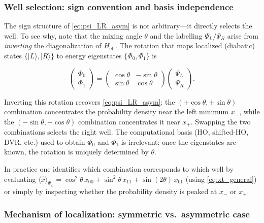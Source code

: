 \subsubsection{Well selection: sign convention and basis independence}

The sign structure of \cref{eq:psi_LR_asym} is not arbitrary---it directly selects
the well. To see why, note that the mixing angle $\theta$ and the labelling
$\Psi_L / \Psi_R$ arise from \emph{inverting} the diagonalization of $H_{\text{eff}}$.
The rotation that maps localized (diabatic) states $\{|L\rangle, |R\rangle\}$ to
energy eigenstates $\{\Phi_0, \Phi_1\}$ is

\begin{equation}
  \begin{pmatrix}\Phi_0 \\ \Phi_1\end{pmatrix}
  =
  \begin{pmatrix}\cos\theta & -\sin\theta \\ \sin\theta & \cos\theta\end{pmatrix}
  \begin{pmatrix}\Psi_L \\ \Psi_R\end{pmatrix}.
\end{equation}

Inverting this rotation recovers \cref{eq:psi_LR_asym}: the $(+\cos\theta, +\sin\theta)$
combination concentrates the probability density near the left minimum $x_-$, while the
$(-\sin\theta, +\cos\theta)$ combination concentrates it near $x_+$. Swapping the two
combinations selects the right well. The computational basis (HO, shifted-HO, DVR, etc.)
used to obtain $\Phi_0$ and $\Phi_1$ is irrelevant: once the eigenstates are known, the
rotation is uniquely determined by $\theta$.

\begin{remark}
  In practice one identifies which combination corresponds to which well by evaluating
  $\langle\hat{x}\rangle_{\Psi_L} = \cos^2\theta\,x_{00} + \sin^2\theta\,x_{11}
   + \sin(2\theta)\,x_{01}$ (using \cref{eq:xt_general}) or simply by inspecting
  whether the probability density is peaked at $x_-$ or $x_+$.
\end{remark}

\subsubsection{Mechanism of localization: symmetric vs.\ asymmetric case}

